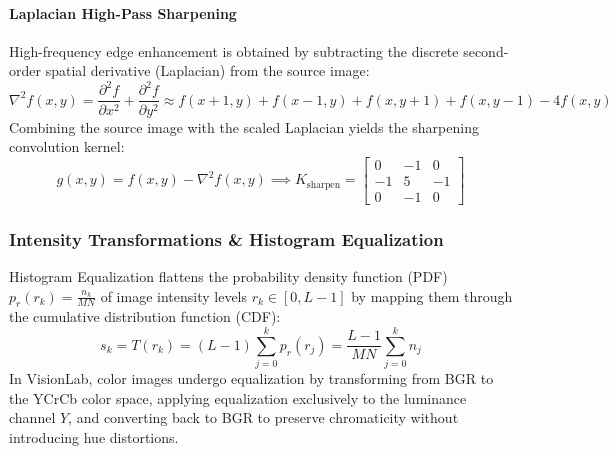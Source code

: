 \paragraph{Laplacian High-Pass Sharpening}
High-frequency edge enhancement is obtained by subtracting the discrete second-order spatial derivative (Laplacian) from the source image:
\begin{equation}
    \nabla^2 f(x,y) = \frac{\partial^2 f}{\partial x^2} + \frac{\partial^2 f}{\partial y^2} \approx f(x+1,y) + f(x-1,y) + f(x,y+1) + f(x,y-1) - 4f(x,y)
\end{equation}
Combining the source image with the scaled Laplacian yields the sharpening convolution kernel:
\begin{equation}
    g(x,y) = f(x,y) - \nabla^2 f(x,y) \implies K_{\text{sharpen}} = \begin{bmatrix} 0 & -1 & 0 \\ -1 & 5 & -1 \\ 0 & -1 & 0 \end{bmatrix}
\end{equation}

\subsubsection{Intensity Transformations \& Histogram Equalization}
Histogram Equalization flattens the probability density function (PDF) $p_r(r_k) = \frac{n_k}{MN}$ of image intensity levels $r_k \in [0, L-1]$ by mapping them through the cumulative distribution function (CDF):
\begin{equation}
    s_k = T(r_k) = (L - 1) \sum_{j=0}^k p_r(r_j) = \frac{L - 1}{MN} \sum_{j=0}^k n_j
\end{equation}
In VisionLab, color images undergo equalization by transforming from BGR to the YCrCb color space, applying equalization exclusively to the luminance channel $Y$, and converting back to BGR to preserve chromaticity without introducing hue distortions.

